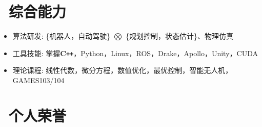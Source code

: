 \documentclass{resume}
\begin{document}
\section{\faCogs\ 综合能力}
\begin{itemize}[parsep=0.5ex]
  \item 算法研发: \{机器人，自动驾驶\} $\boldsymbol{\bigotimes}$ \{规划控制，状态估计\}、物理仿真
  \item 工具技能: 掌握\textbf{C\texttt{++}}，Python，Linux，ROS，Drake，Apollo，Unity，CUDA
  \item 理论课程: 线性代数，微分方程，数值优化，最优控制，智能无人机，{GAMES103/104}
\end{itemize}

\section{\faHeartO\ 个人荣誉}
\end{document}
